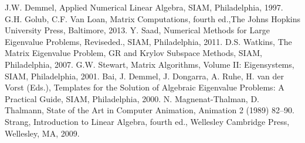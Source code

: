 \documentclass[../main.tex]{subfiles}
\begin{document}
\begin{thebibliography}{4}
 J.W. Demmel, Applied Numerical Linear Algebra, SIAM, Philadelphia, 1997.
  G.H. Golub, C.F. Van Loan, Matrix Computations, fourth ed.,The Johns Hopkins University Press, Baltimore, 2013.
  Y. Saad, Numerical Methods for Large Eigenvalue Problems, Reviseded., SIAM, Philadelphia, 2011.
 D.S. Watkins, The Matrix Eigenvalue Problem, GR and Krylov Subspace Methods, SIAM, Philadelphia, 2007.
  G.W. Stewart, Matrix Algorithms, Volume II: Eigensystems, SIAM, Philadelphia, 2001.
 Bai, J. Demmel, J. Dongarra, A. Ruhe, H. van der Vorst (Eds.), Templates for the Solution of Algebraic Eigenvalue Problems: A Practical Guide, SIAM, Philadelphia, 2000.
  N. Magnenat-Thalman, D. Thalmann, State of the Art in Computer Animation, Animation 2 (1989) 82–90.
 Strang, Introduction to Linear Algebra, fourth ed., Wellesley Cambridge Press, Wellesley, MA, 2009.

\end{thebibliography}
\end{document}

